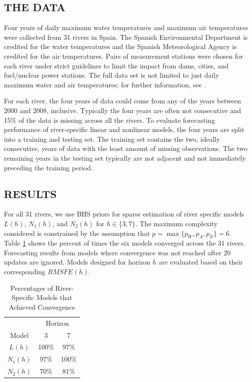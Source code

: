  
 
 
 \vskip 3mm
 
 \subsection{THE DATA} 
 
Four years of daily maximum water temperatures and maximum air temperatures were collected from 31 rivers in Spain. The Spanish Environmental Department is credited for the water temperatures and the Spanish Meteorological Agency is credited for the air temperatures. Pairs of measurement stations were chosen for each river under strict guidelines to limit the impact from dams, cities, and fuel/nuclear power stations. The full data set is not limited to just daily maximum water and air temperatures; for further information, see \cite{Kamarianakis2016}.
 
For each river, the four years of data could come from any of the years between 2000 and 2008, inclusive. Typically the four years are often not consecutive and 15\% of the data is missing across all the rivers. To evaluate forecasting performance of river-specific linear and nonlinear models, the four years are split into a training and testing set. The training set contains the two, ideally consecutive, years of data with the least amount of missing observations. The two remaining years in the testing set typically are not adjacent and not immediately preceding the training period. 

\vskip 3mm

\subsection{RESULTS}

For all 31 rivers, we use BHS priors for sparse estimation of river specific models $L(h)$, $N_1(h)$, and $N_2(h)$ for $h \in \{3,7\}$. The maximum complexity considered is constrained by the assumption that $p=\max \{p_W, p_A, p_E\}=6$. Table \ref{tab:convriv} shows the percent of times the six models converged across the 31 rivers. Forecasting results from models where convergence was not reached after 20 updates are ignored. Models designed for horizon $h$ are evaluated based on their corresponding $RMSFE(h)$.

\begin{table}[!h]
	\small
  \centering
  \caption{ Percentages of River-Specific Models that Achieved Convergence }
    \begin{tabular}{ccc}
    \toprule
    &  \multicolumn{2}{c}{Horizon}  \\
    Model & 3 & 7\\
    \midrule
    $L(h)$ &  100\% & 97\%\\
    $N_1(h)$ & 97\% & 100\%\\
    $N_2(h)$ & 70\% & 81\%\\
    \bottomrule
    \end{tabular}%
  \label{tab:convriv}%
\end{table}%

